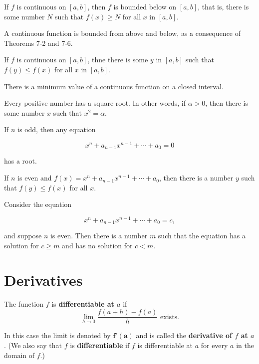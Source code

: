 \documentclass[11pt]{article}
\newcommand{\setnumref}[2]{\setcounter{#1}{#2}\addtocounter{#1}{-1}}
\newcommand{\sectionref}[1]{\setnumref{section}{#1}\section}
\newenvironment{theoremref}[1]
{\renewcommand\theinnerthmref{#1}\innerthmref}
{\endinnerthmref}
\begin{document}
\begin{theoremref}{7-6}
  If $f$ is continuous on $[a,b]$, then $f$ is bounded below on
  $[a,b]$, that is, there is some number $N$ such that $f(x) \geq N$
  for all $x$ in $[a,b]$.
\end{theoremref}

\begin{remark}
  A continuous function is bounded from above and below, as a
  consequence of Theorems 7-2 and 7-6.
\end{remark}

\begin{theoremref}{7-7}
  If $f$ is continuous on $[a,b]$, thne there is some $y$ in $[a,b]$
  such that $f(y) \leq f(x)$ for all $x$ in $[a,b]$.
  \begin{remark}
    There is a minimum value of a continuous function on a closed interval.
  \end{remark}
\end{theoremref}

\begin{theoremref}{7-8}
  Every positive number has a square root. In other words, if $\alpha
  > 0$, then there is some number $x$ such that $x^2 = \alpha$.
\end{theoremref}

\begin{theoremref}{7-9}
  If $n$ is odd, then any equation

  \[
    x^n + a_{n-1}x^{n-1} + \cdots + a_0 = 0
  \]

has a root.
\end{theoremref}

\begin{theoremref}{7-10}
  If $n$ is even and $f(x) = x^n + a_{n-1}x^{n-1} + \cdots + a_0$,
  then there is a number $y$ such that $f(y) \leq f(x)$ for all $x$.
\end{theoremref}

\begin{theoremref}{7-11}
  Consider the equation

  \[
  x^n + a_{n-1}x^{n-1} + \cdots + a_0 = c,
  \]

  and suppose $n$ is even. Then there is a number $m$ such that the
  equation has a solution for $c \geq m$ and has no solution for $c < m$.
\end{theoremref}

\sectionref{9}{Derivatives}

\begin{definition}
  The function $f$ is \textbf{differentiable at $a$} if
  \[
    \lim_{h \to 0}{\frac{f(a+h) - f(a)}{h}} \text{ exists.}
  \]

  In this case the limit is denoted by $\bm{f'(a)}$ and is called the
  \textbf{derivative of $f$ at $a$}. (We also say that $f$ is
  \textbf{differentiable} if $f$ is differentiable at $a$ for every
  $a$ in the domain of $f$.)
\end{definition}
\end{document}
